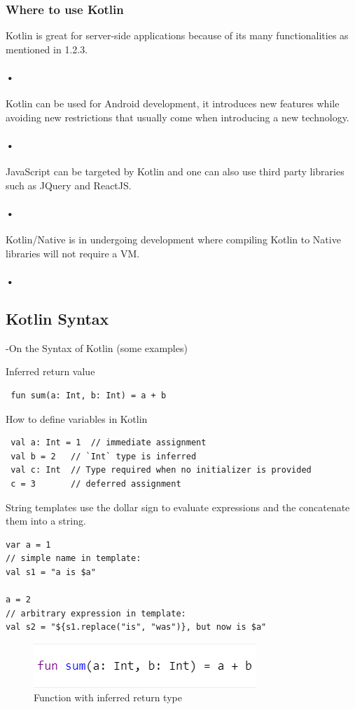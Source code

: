 \subsubsection{Where to use Kotlin}
Kotlin is great for server-side applications because of its many functionalities as mentioned in 1.2.3. \paragraph{•}
Kotlin can be used for Android development, it introduces new features while avoiding new restrictions that usually come when introducing a new technology. \paragraph{•}
JavaScript can be targeted by Kotlin and one can also use third party libraries such as JQuery and ReactJS. \paragraph{•}
Kotlin/Native is in undergoing development where compiling Kotlin to Native libraries will not require a VM. \paragraph{•}


\subsection{Kotlin Syntax}
 -On the Syntax of Kotlin (some examples)
 
 Inferred return value
 \begin{lstlisting}
 fun sum(a: Int, b: Int) = a + b
 \end{lstlisting}
 
 How to define variables in Kotlin
 \begin{lstlisting}
 val a: Int = 1  // immediate assignment
 val b = 2   // `Int` type is inferred
 val c: Int  // Type required when no initializer is provided
 c = 3       // deferred assignment
\end{lstlisting}

String templates use the dollar sign to evaluate expressions and the concatenate them into a string.
\begin{lstlisting}
var a = 1
// simple name in template:
val s1 = "a is $a" 

a = 2
// arbitrary expression in template:
val s2 = "${s1.replace("is", "was")}, but now is $a"
\end{lstlisting}
 
 
 \begin{figure}
 \centering
 \includegraphics[scale=1]{figs/InferredReturnType.png}
 \caption{Function with inferred return type}
 \label{fig:inferred return type}
\end{figure}
 



